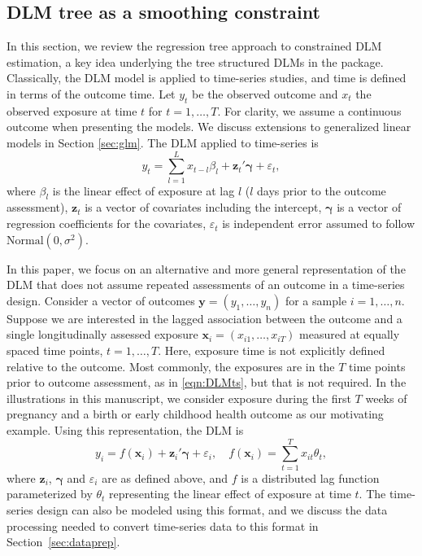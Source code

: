 \subsection{DLM tree as a smoothing constraint}

In this section, we review the regression tree approach to constrained DLM estimation, a key idea underlying the tree structured DLMs in the  package. Classically, the DLM model is applied to time-series studies, and time is defined in terms of the outcome time. Let $y_{t}$ be the observed outcome and $x_{t}$ the observed exposure at time $t$ for $t=1,\ldots,T$. For clarity, we assume a continuous outcome when presenting the models. We discuss extensions to generalized linear models in Section \ref{sec:glm}. The DLM applied to time-series is
\begin{equation}
    \label{eqn:DLMts}
    y_{t}= \sum_{l=1}^L x_{t-l}\beta_l + \bm{z}_{t}' \bm{\gamma} + \varepsilon_{t},
\end{equation}
where $\beta_l$ is the linear effect of exposure at lag $l$ ($l$ days prior to the outcome assessment), $\bm{z}_{t}$ is a vector of covariates including the intercept, $\bm{\gamma}$ is a vector of regression coefficients for the covariates, $\varepsilon_{t}$ is independent error assumed to follow $\text{Normal}(0, \sigma^2)$.

In this paper, we focus on an alternative and more general representation of the DLM that does not assume repeated assessments of an outcome in a time-series design. Consider a vector of outcomes $\bm{y} = (y_1, \ldots, y_n)$ for a sample $i = 1, \ldots, n$. Suppose we are interested in the lagged association between the outcome and a single longitudinally assessed exposure $\bm{x}_i = (x_{i1}, \ldots, x_{iT})$ measured at equally spaced time points, $t = 1, \ldots, T$. Here, exposure time is not explicitly defined relative to the outcome. Most commonly, the exposures are in the $T$ time points prior to outcome assessment, as in \eqref{eqn:DLMts}, but that is not required. In the illustrations in this manuscript, we consider exposure during the first $T$ weeks of pregnancy and a birth or early childhood health outcome as our motivating example. Using this representation, the DLM is
\begin{equation}
    \label{eqn:DLM}
    y_i = f(\bm{x}_i) + \bm{z}_i' \bm{\gamma} + \varepsilon_i, \quad f(\bm{x}_i) = \sum_{t=1}^T x_{it}\theta_t,
\end{equation}
where $\bm{z}_i$, $\bm{\gamma}$ and $\varepsilon_i$ are as defined above, and $f$ is a distributed lag function parameterized by $\theta_t$ representing the linear effect of exposure at time $t$. The time-series design can also be modeled using this format, and we discuss the data processing needed to convert time-series data to this format in Section~\ref{sec:dataprep}.

